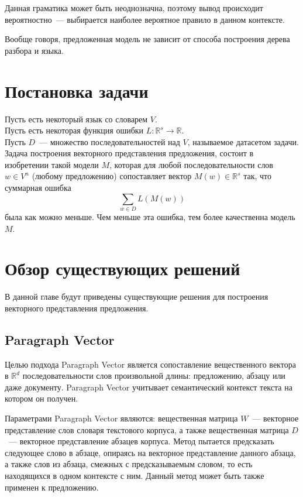 Данная граматика может быть неоднозначна, 
поэтому вывод происходит вероятностно~--- выбирается наиболее вероятное правило в данном контексте.

Вообще говоря, предложенная модель не зависит от способа построения дерева разбора и языка.

\section{Постановка задачи}
\noindent Пусть есть некоторый язык со словарем $V$.\\
Пусть есть некоторая функция ошибки $L:\mathbb{R}^s \to \mathbb{R}$.\\
Пусть $D$~--- множество последовательностей над $V$, называемое датасетом задачи.\\
Задача построения векторного представления предложения, состоит в изобретении такой модели $M$, 
которая для любой последовательности слов $w \in V^n$ (любому предложению) сопоставляет
вектор $M(w) \in \mathbb{R}^s$ так, что суммарная ошибка $$\sum_{w \in D} L(M(w))$$ была как можно меньше.
Чем меньше эта ошибка, тем более качественна модель $M$.\\

\section{Обзор существующих решений}

В данной главе будут приведены существующие решения для построения векторного представления предложения.

\subsection{Paragraph Vector}
Целью подхода Paragraph Vector является сопоставление вещественного вектора в $\mathbb{R}^d$ последовательности слов произвольной длины: предложению, абзацу или даже документу\cite{DBLP:journals/corr/LeM14}.
Paragraph Vector учитывает семантический контекст текста на котором он получен.

Параметрами Paragraph Vector являются: вещественная матрица $W$~--- векторное представление слов словаря текстового корпуса, а также вещественная матрица $D$~--- векторное представление абзацев корпуса. Метод пытается предсказать следующее слово в абзаце, опираясь на векторное представление данного абзаца, а также слов из абзаца, смежных с предсказываемым словом, то есть находящихся в одном контексте с ним.
Данный метод может быть также применен к предложению.

